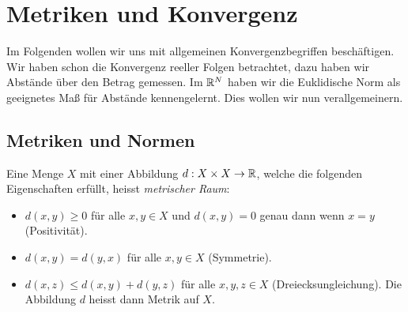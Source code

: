 \chapter{Metriken und Konvergenz}
\label{\detokenize{metrik/metrik:metriken-und-konvergenz}}\label{\detokenize{metrik/metrik::doc}}
Im Folgenden wollen wir uns mit allgemeinen Konvergenzbegriffen beschäftigen. Wir haben schon die Konvergenz reeller Folgen betrachtet, dazu haben wir Abstände über den Betrag gemessen. Im \(\mathbb{R}^N\) haben wir die Euklidische Norm als geeignetes Maß für Abstände kennengelernt. Dies wollen wir nun verallgemeinern.


\section{Metriken und Normen}
\label{\detokenize{metrik/normen:metriken-und-normen}}\label{\detokenize{metrik/normen::doc}}\label{metrik/normen:definition-0}
\begin{definition}{}{}



Eine Menge \(X\) mit einer Abbildung \(d: X \times X \rightarrow \mathbb{R}\), welche die folgenden Eigenschaften erfüllt, heisst \emph{metrischer Raum}:
\begin{itemize}
\item {} 
\(d(x,y) \geq 0\) für alle \(x,y \in X\) und \(d(x,y) = 0\) genau dann wenn \(x=y\) (Positivität).

\item {} 
\(d(x,y) = d(y,x)\) für alle \(x,y \in X\)  (Symmetrie).

\item {} 
\(d(x,z) \leq d(x,y) + d(y,z)\) für alle \(x,y,z \in X\)  (Dreiecksungleichung).
Die Abbildung \(d\) heisst dann Metrik auf \(X\).

\end{itemize}
\end{definition}

